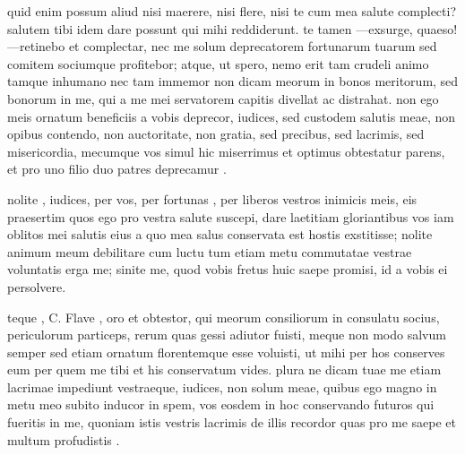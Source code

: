  quid enim possum aliud nisi maerere, nisi flere, nisi te cum mea salute complecti? salutem tibi idem dare possunt qui mihi reddiderunt. te tamen —exsurge, quaeso!—retinebo et complectar, nec me solum deprecatorem fortunarum tuarum sed comitem sociumque profitebor; atque, ut spero, nemo erit tam crudeli animo tamque inhumano nec tam immemor non dicam meorum in bonos meritorum, sed bonorum in me, qui a me mei servatorem capitis divellat ac distrahat. non ego meis ornatum beneficiis a vobis deprecor, iudices, sed custodem salutis meae, non opibus contendo, non auctoritate, non gratia, sed precibus, sed lacrimis, sed misericordia, mecumque vos simul hic miserrimus et optimus obtestatur parens, et pro uno filio duo patres deprecamur .

 nolite , iudices, per vos, per fortunas , per liberos vestros inimicis meis, eis praesertim quos ego pro vestra salute suscepi, dare laetitiam gloriantibus vos iam oblitos mei salutis eius a quo mea salus conservata est hostis exstitisse; nolite animum meum debilitare cum luctu tum etiam metu commutatae vestrae voluntatis erga me; sinite me, quod vobis fretus huic saepe promisi, id a vobis ei persolvere.

 teque , C. Flave , oro et obtestor, qui meorum consiliorum in consulatu socius, periculorum particeps, rerum quas gessi adiutor fuisti, meque non modo salvum semper sed etiam ornatum florentemque esse voluisti, ut mihi per hos conserves eum per quem me tibi et his conservatum vides. plura ne dicam tuae me etiam lacrimae impediunt vestraeque, iudices, non solum meae, quibus ego magno in metu meo subito inducor in spem, vos eosdem in hoc conservando futuros qui fueritis in me, quoniam istis vestris lacrimis de illis recordor quas pro me saepe et multum profudistis .
